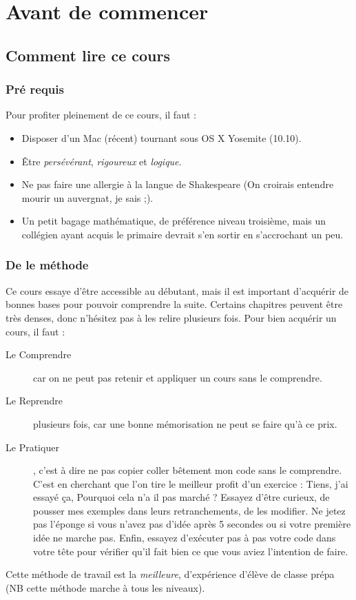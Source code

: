 \chapter{Avant de commencer}

\section{Comment lire ce cours}
\subsection{Pré requis}
Pour profiter pleinement de ce cours, il faut :
\begin{itemize}
\item Disposer d'un Mac (récent) tournant sous OS X Yosemite (10.10).
\item Être \emph{persévérant}, \emph{rigoureux} et \emph{logique}.
\item Ne pas faire une allergie à la langue de Shakespeare (On croirais entendre mourir un
auvergnat, je sais ;).
\item Un petit bagage mathématique, de préférence niveau troisième, mais un collégien ayant
acquis le primaire devrait s'en sortir en s’accrochant un peu.
\end{itemize}

\subsection{De le méthode}
Ce cours essaye d'être accessible au débutant, mais il est important d'acquérir de bonnes
bases pour pouvoir comprendre la suite. Certains chapitres peuvent être très denses,
donc n'hésitez pas à les relire plusieurs fois.
Pour bien acquérir un cours, il faut :
\begin{description}
\item[Le Comprendre] car on ne peut pas retenir et appliquer un cours sans le comprendre.
\item[Le Reprendre] plusieurs fois, car une bonne mémorisation ne peut se faire qu'à ce prix.
\item[Le Pratiquer], c'est à dire ne pas copier coller bêtement mon code sans le comprendre.
C'est en cherchant que l'on tire le meilleur profit d'un exercice : Tiens, j'ai essayé ça,
Pourquoi cela n'a il pas marché ? Essayez d'être curieux, de pousser mes exemples
dans leurs retranchements, de les modifier. Ne jetez pas l'éponge si vous n'avez pas
d'idée après 5 secondes ou si votre première idée ne marche pas. Enfin, essayez
d'exécuter pas à pas votre code dans votre tête pour vérifier qu'il fait bien ce que vous
aviez l'intention de faire.
\end{description}
Cette méthode de travail est la \emph{meilleure}, d'expérience d'élève de classe prépa (NB cette
méthode marche à tous les niveaux).
